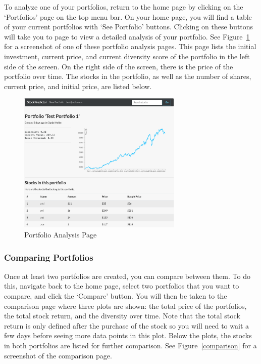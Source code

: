\documentclass{article}
\begin{document}
To analyze one of your portfolios, return to the home page by clicking on the `Portfolios' page on the top menu bar. On your home page, you will find a table of your current portfolios with `See Portfolio' buttons. Clicking on these buttons will take you to page to view a detailed analysis of your portfolio. See Figure~\ref{fig:analysis} for a screenshot of one of these portfolio analysis pages. This page lists the initial investment, current price, and current diversity score of the portfolio in the left side of the screen. On the right side of the screen, there is the price of the portfolio over time. The stocks in the portfolio, as well as the number of shares, current price, and initial price, are listed below. 

\begin{figure}[H]
\begin{center}
\includegraphics[width=0.7\textwidth]{analysis}
\caption{\label{fig:analysis} Portfolio Analysis Page}
\end{center}
\end{figure}

\subsubsection{Comparing Portfolios}
Once at least two portfolios are created, you can compare between them. To do this, navigate back to the home page, select two portfolios that you want to compare, and click the `Compare' button. You will then be taken to the comparison page where three plots are shown: the total price of the portfolios, the total stock return, and the diversity over time. Note that the total stock return is only defined after the purchase of the stock so you will need to wait a few days before seeing more data points in this plot. Below the plots, the stocks in both portfolios are listed for further comparison. See Figure~\ref{comparison} for a screenshot of the comparison page.
\end{document}
